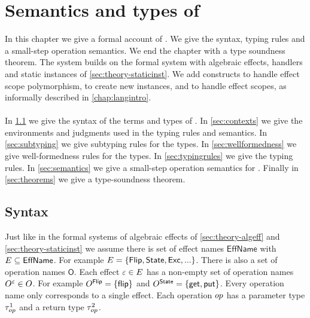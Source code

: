 {%

\chapter{\label{chap:langtheory}Semantics and types of \lang{}}

In this chapter we give a formal account of \lang{}.
We give the syntax, typing rules and a small-step operation semantics.
We end the chapter with a type soundness theorem.
The system builds on the formal system with algebraic effects, handlers and static instances of \cref{sec:theory-staticinst}.
We add constructs to handle effect scope polymorphism, to create new instances, and to handle effect scopes, as informally described in \cref{chap:langintro}.
\\\\
In \cref{sec:syntax} we give the syntax of the terms and types of \lang{}.
In \cref{sec:contexts} we give the environments and judgments used in the typing rules and semantics.
In \cref{sec:subtyping} we give subtyping rules for the types.
In \cref{sec:wellformedness} we give well-formedness rules for the types.
In \cref{sec:typingrules} we give the typing rules.
In \cref{sec:semantics} we give a small-step operation semantics for \lang{}.
Finally in \cref{sec:theorems} we give a type-soundness theorem.

\section{Syntax}
\label{sec:syntax}
Just like in the formal systems of algebraic effects of \cref{sec:theory-algeff} and \cref{sec:theory-staticinst}
we assume there is set of effect names $\mathsf{EffName}$ with $E \subseteq \mathsf{EffName}$.
For example $E = \{ \mathsf{Flip}, \mathsf{State}, \mathsf{Exc}, ... \}$.
There is also a set of operation names $\mathsf{O}$.
Each effect $\varepsilon \in E$ has a non-empty set of operation names $O^{\varepsilon} \in O$.
For example $O^{\mathsf{Flip}} = \{\mathsf{flip}\}$ and $O^{\mathsf{State}} = \{\mathsf{get}, \mathsf{put}\}$.
Every operation name only corresponds to a single effect.
Each operation $op$ has a parameter type $\tau^1_{op}$ and a return type $\tau^2_{op}$.
\\\\

}
